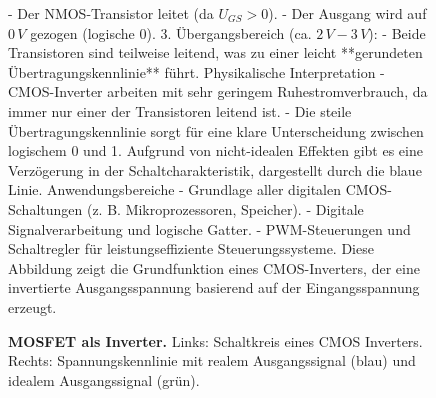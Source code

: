 {\begin{figure}[H]
\begin{minipage}[c]{0.49\textwidth}
{        - Der NMOS-Transistor leitet (da \( U_{GS} > 0 \)).  
        - Der Ausgang wird auf \(0 \, V\) gezogen (logische 0).  
        3. Übergangsbereich (ca. \(2 \,V - 3 \, V\)):
        - Beide Transistoren sind teilweise leitend, was zu einer leicht **gerundeten Übertragungskennlinie** führt.  
        Physikalische Interpretation
        - CMOS-Inverter arbeiten mit sehr geringem Ruhestromverbrauch, da immer nur einer der Transistoren leitend ist.  
        - Die steile Übertragungskennlinie sorgt für eine klare Unterscheidung zwischen logischem 0 und 1.  
        Aufgrund von nicht-idealen Effekten gibt es eine Verzögerung in der Schaltcharakteristik, dargestellt durch die blaue Linie.  
        Anwendungsbereiche
        - Grundlage aller digitalen CMOS-Schaltungen (z. B. Mikroprozessoren, Speicher).  
        - Digitale Signalverarbeitung und logische Gatter.  
        - PWM-Steuerungen und Schaltregler für leistungseffiziente Steuerungssysteme.  
        Diese Abbildung zeigt die Grundfunktion eines CMOS-Inverters, der eine invertierte Ausgangsspannung basierend auf der Eingangsspannung erzeugt.}
    \end{minipage}
    \caption{\textbf{MOSFET als Inverter.} Links: Schaltkreis eines CMOS Inverters. Rechts: Spannungskennlinie mit 
    realem Ausgangssignal (blau) und idealem Ausgangssignal (grün).} 
    \label{fig:MOSFETAlsInverter}
\end{figure}}





